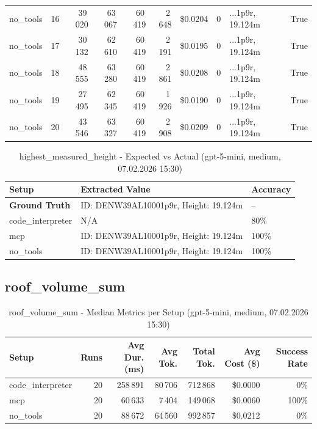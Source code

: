 \documentclass[a4paper,11pt]{article}
\begin{document}
\begin{table}[H]
{\begin{tabular}{l r r r r r r r l r}
no\_tools & 16 & 39\,020 & 63\,067 & 60\,419 & 2\,648 & \$0.0204 & 0 & ...1p9r, 19.124m & True \\
no\_tools & 17 & 30\,132 & 62\,610 & 60\,419 & 2\,191 & \$0.0195 & 0 & ...1p9r, 19.124m & True \\
no\_tools & 18 & 48\,555 & 63\,280 & 60\,419 & 2\,861 & \$0.0208 & 0 & ...1p9r, 19.124m & True \\
no\_tools & 19 & 27\,495 & 62\,345 & 60\,419 & 1\,926 & \$0.0190 & 0 & ...1p9r, 19.124m & True \\
no\_tools & 20 & 43\,546 & 63\,327 & 60\,419 & 2\,908 & \$0.0209 & 0 & ...1p9r, 19.124m & True \\
\bottomrule
\end{tabular}}
\end{table}

\begin{table}[H]
\centering
\scriptsize
\caption{highest\_measured\_height - Expected vs Actual (gpt-5-mini, medium, 07.02.2026 15:30)}
\begin{tabular}{l l l}
\toprule
Setup & Extracted Value & Accuracy \\
\midrule
\textbf{Ground Truth} & ID: DENW39AL10001p9r, Height: 19.124m & -- \\
\midrule
code\_interpreter & N/A & 80\% \\
mcp & ID: DENW39AL10001p9r, Height: 19.124m & 100\% \\
no\_tools & ID: DENW39AL10001p9r, Height: 19.124m & 100\% \\
\bottomrule
\end{tabular}
\end{table}

\clearpage

\subsection{roof\_volume\_sum}

\begin{table}[H]
\centering
\scriptsize
\caption{roof\_volume\_sum - Median Metrics per Setup (gpt-5-mini, medium, 07.02.2026 15:30)}
\label{tab:combined\_roof\_volume\_sum\_metrics\_20260207}
\begin{tabular}{l r r r r r r}
\toprule
Setup & Runs & Avg Dur. (ms) & Avg Tok. & Total Tok. & Avg Cost (\$) & Success Rate \\
\midrule
code\_interpreter & 20 & 258\,891 & 80\,706 & 712\,868 & \$0.0000 & 0\% \\
mcp & 20 & 60\,633 & 7\,404 & 149\,068 & \$0.0060 & 100\% \\
no\_tools & 20 & 88\,672 & 64\,560 & 992\,857 & \$0.0212 & 0\% \\
\bottomrule
\end{tabular}
\end{table}
\end{document}

